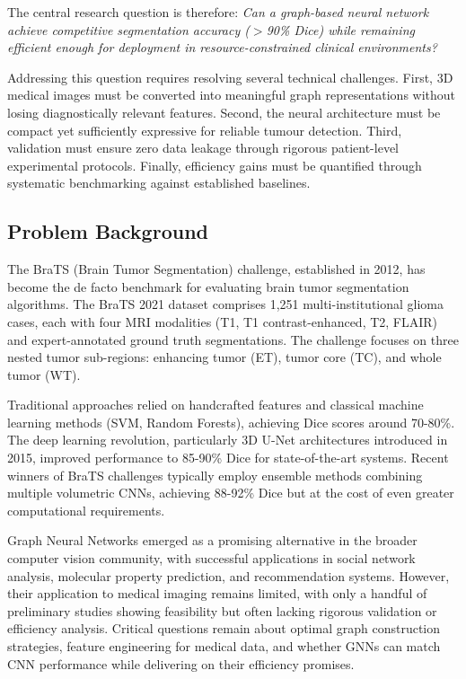 The central research question is therefore: \textit{Can a graph-based neural network achieve competitive segmentation accuracy ($>$90\% Dice) while remaining efficient enough for deployment in resource-constrained clinical environments?}

Addressing this question requires resolving several technical challenges. First, 3D medical images must be converted into meaningful graph representations without losing diagnostically relevant features. Second, the neural architecture must be compact yet sufficiently expressive for reliable tumour detection. Third, validation must ensure zero data leakage through rigorous patient-level experimental protocols. Finally, efficiency gains must be quantified through systematic benchmarking against established baselines.

\subsection{Problem Background}

The BraTS (Brain Tumor Segmentation) challenge, established in 2012, has become the de facto benchmark for evaluating brain tumor segmentation algorithms. The BraTS 2021 dataset comprises 1,251 multi-institutional glioma cases, each with four MRI modalities (T1, T1 contrast-enhanced, T2, FLAIR) and expert-annotated ground truth segmentations. The challenge focuses on three nested tumor sub-regions: enhancing tumor (ET), tumor core (TC), and whole tumor (WT).

Traditional approaches relied on handcrafted features and classical machine learning methods (SVM, Random Forests), achieving Dice scores around 70-80\%. The deep learning revolution, particularly 3D U-Net architectures introduced in 2015, improved performance to 85-90\% Dice for state-of-the-art systems. Recent winners of BraTS challenges typically employ ensemble methods combining multiple volumetric CNNs, achieving 88-92\% Dice but at the cost of even greater computational requirements.

Graph Neural Networks emerged as a promising alternative in the broader computer vision community, with successful applications in social network analysis, molecular property prediction, and recommendation systems. However, their application to medical imaging remains limited, with only a handful of preliminary studies showing feasibility but often lacking rigorous validation or efficiency analysis. Critical questions remain about optimal graph construction strategies, feature engineering for medical data, and whether GNNs can match CNN performance while delivering on their efficiency promises.

